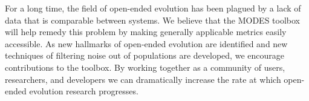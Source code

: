 \documentclass[letterpaper]{article}
\begin{document}



For a long time, the field of open-ended evolution has been plagued by a lack of data that is comparable between systems. We believe that the MODES toolbox will help remedy this problem by making generally applicable metrics easily accessible. As new hallmarks of open-ended evolution are identified and new techniques of filtering noise out of populations are developed, we encourage contributions to the toolbox. By working together as a community of users, researchers, and developers we can dramatically increase the rate at which open-ended evolution research progresses.
\end{document}
